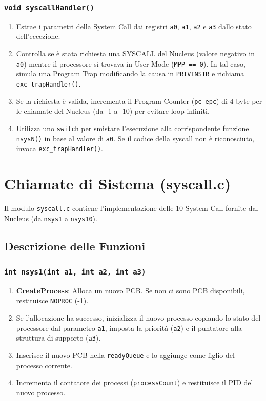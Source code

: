 \documentclass[a4paper,12pt]{article}
\begin{document}
\subsubsection{\texttt{void syscallHandler()}}
\begin{enumerate}
    \item Estrae i parametri della System Call dai registri \texttt{a0}, \texttt{a1}, \texttt{a2} e \texttt{a3} dallo stato dell'eccezione.
    \item Controlla se è stata richiesta una SYSCALL del Nucleus (valore negativo in \texttt{a0}) mentre il processore si trovava in User Mode (\texttt{MPP == 0}). In tal caso, simula una Program Trap modificando la causa in \texttt{PRIVINSTR} e richiama \texttt{exc\_trapHandler()}.
    \item Se la richiesta è valida, incrementa il Program Counter (\texttt{pc\_epc}) di 4 byte per le chiamate del Nucleus (da -1 a -10) per evitare loop infiniti.
    \item Utilizza uno \texttt{switch} per smistare l'esecuzione alla corrispondente funzione \texttt{nsysN()} in base al valore di \texttt{a0}. Se il codice della syscall non è riconosciuto, invoca \texttt{exc\_trapHandler()}.
\end{enumerate}

\vspace{0.5cm}
\section{Chiamate di Sistema (syscall.c)}
Il modulo \texttt{syscall.c} contiene l'implementazione delle 10 System Call fornite dal Nucleus (da \texttt{nsys1} a \texttt{nsys10}).

\vspace{0.5cm}
\subsection{Descrizione delle Funzioni}

\subsubsection{\texttt{int nsys1(int a1, int a2, int a3)}}
\begin{enumerate}
    \item \textbf{CreateProcess}: Alloca un nuovo PCB. Se non ci sono PCB disponibili, restituisce \texttt{NOPROC} (-1).
    \item Se l'allocazione ha successo, inizializza il nuovo processo copiando lo stato del processore dal parametro \texttt{a1}, imposta la priorità (\texttt{a2}) e il puntatore alla struttura di supporto (\texttt{a3}).
    \item Inserisce il nuovo PCB nella \texttt{readyQueue} e lo aggiunge come figlio del processo corrente.
    \item Incrementa il contatore dei processi (\texttt{processCount}) e restituisce il PID del nuovo processo.
\end{enumerate}
\end{document}
